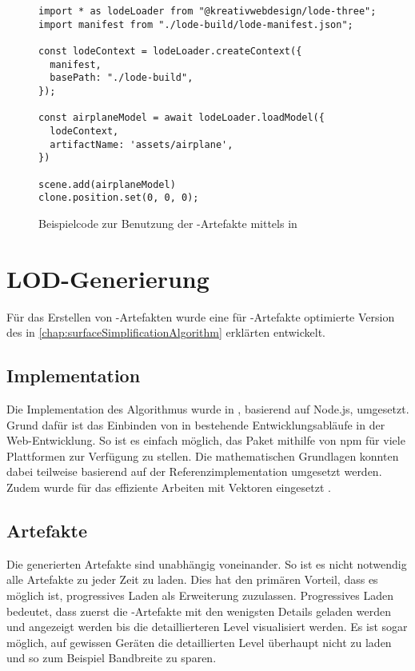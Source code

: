 \begin{figure}[H]
  \begin{lstlisting}[style=JavaScript]
import * as lodeLoader from "@kreativwebdesign/lode-three";
import manifest from "./lode-build/lode-manifest.json";

const lodeContext = lodeLoader.createContext({
  manifest,
  basePath: "./lode-build",
});

const airplaneModel = await lodeLoader.loadModel({
  lodeContext,
  artifactName: 'assets/airplane',
})

scene.add(airplaneModel)
clone.position.set(0, 0, 0);
  \end{lstlisting}
  \caption{Beispielcode zur Benutzung der -Artefakte mittels  in }
  \label{code:lodeThreeUsage}
\end{figure}

\section{LOD-Generierung}

Für das Erstellen von -Artefakten wurde eine für -Artefakte optimierte Version des in \autoref{chap:surfaceSimplificationAlgorithm} erklärten  entwickelt.

\subsection{Implementation}

Die Implementation des Algorithmus wurde in , basierend auf \gls{Node.js}, umgesetzt. Grund dafür ist das Einbinden von  in bestehende Entwicklungsabläufe in der Web-Entwicklung. So ist es einfach möglich, das Paket mithilfe von \gls{npm} für viele Plattformen zur Verfügung zu stellen.
Die mathematischen Grundlagen konnten dabei teilweise basierend auf der Referenzimplementation umgesetzt werden. Zudem wurde  für das effiziente Arbeiten mit Vektoren eingesetzt \cite{glMatrix}.

\subsection{Artefakte}

Die generierten Artefakte sind unabhängig voneinander. So ist es nicht notwendig alle Artefakte zu jeder Zeit zu laden. Dies hat den primären Vorteil, dass es möglich ist, progressives Laden als Erweiterung zuzulassen. Progressives Laden bedeutet, dass zuerst die -Artefakte mit den wenigsten Details geladen werden und angezeigt werden bis die detaillierteren Level visualisiert werden.
Es ist sogar möglich, auf gewissen Geräten die detaillierten Level überhaupt nicht zu laden und so zum Beispiel Bandbreite zu sparen.

